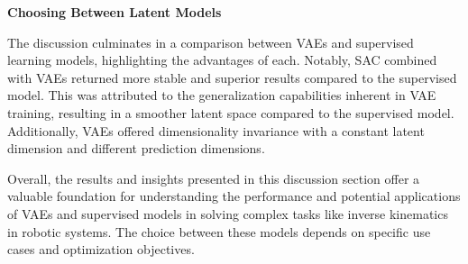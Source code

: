 \textbf{Choosing Between Latent Models}

The discussion culminates in a comparison between VAEs and supervised learning models, highlighting the advantages of each. Notably, SAC combined with VAEs returned more stable and superior results compared to the supervised model. This was attributed to the generalization capabilities inherent in VAE training, resulting in a smoother latent space compared to the supervised model. Additionally, VAEs offered dimensionality invariance with a constant latent dimension and different prediction dimensions.

Overall, the results and insights presented in this discussion section offer a valuable foundation for understanding the performance and potential applications of VAEs and supervised models in solving complex tasks like inverse kinematics in robotic systems. The choice between these models depends on specific use cases and optimization objectives.
